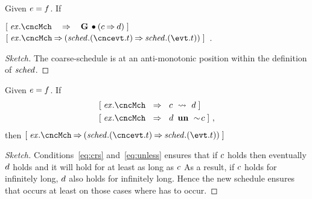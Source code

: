 \begin{Theorem}
  Given $e = f$. If
  \begin{center}
    $\ew{\execution.\cncMch \WIDE\limp \G \initially(\csched \limp
      \cnccsched)}$  $\ew{\execution.\cncMch \limp
      (\schedule.(\cncevt.t) \limp \schedule.(\evt.t))}$~.
  \end{center}

\end{Theorem}
\begin{proof}[Sketch]
  The coarse-schedule is at an anti-monotonic position within the definition of
  $\mathit{sched}$.
\end{proof}

\begin{Theorem}
  \label{thm:ref-rep-crs}
  Given $e = f$.  If
  \begin{align}
    \ew{\execution.\cncMch &\Wide\limp \csched 
         \wide\leadsto \cnccsched}\label{eq:crs} \\
    \label{eq:unless}
    \ew{\execution.\cncMch &\Wide\limp \cnccsched ~\un~ \spneg \csched}~,
  \end{align}
  then $\ew{\execution.\cncMch \limp (\schedule.(\cncevt.t) \limp \schedule.(\evt.t))}$
\end{Theorem}
\begin{proof}[Sketch]
  Conditions~\eqref{eq:crs} and~\eqref{eq:unless} ensures that if $c$ holds
  then eventually $d$ holds and it will hold for at least as long as $c$
  As a result, if
  $c$ holds for infinitely long, $d$ also holds for infinitely long.  Hence
  the new schedule ensures that \cncevt occurs at least on those cases where \evt has to 
  occur.
\end{proof}

